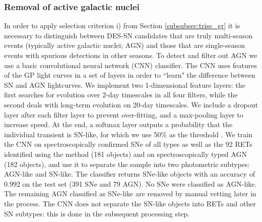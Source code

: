 \documentclass[fleqn,usenatbib,]{mnras}
\newcommand{\replyref}[1]{\color{magenta}#1 \color{black}}
\begin{document}
\subsubsection{Removal of active galactic nuclei \label{subsubsec:cnn}}

In order to apply selection criterion i) from Section \ref{subsubsec:trise_gr} it is necessary to distinguish between DES-SN candidates that are truly multi-season events (typically active galactic nuclei; AGN) and those that are single-season events with spurious detections in other seasons. 
To detect and filter out AGN we use a basic convolutional neural network (CNN) classifier. \replyref{The CNN uses features of the GP light curves in a set of layers in order to ``learn" the difference between SN and AGN lightcurves. We implement two 1-dimensional feature layers: the first searches for evolution over 2-day timescales in all four filters, while the second deals with long-term evolution on 20-day timescales. We include a dropout layer after each filter layer to prevent over-fitting, and a max-pooling layer to increase speed. At the end, a softmax layer outputs a probability that the individual transient is SN-like, for which we use 50\% as the threshold}.  We train the CNN on spectroscopically confirmed SNe of all types as well as the 92 RETs identified using the  method (181 objects) and on spectroscopically typed AGN (182 objects), and use it to separate the sample into two photometric subtypes: AGN-like and SN-like. The classifier returns SNe-like objects with an accuracy of 0.992 on the test set (391 SNe and 79 AGN). No SNe were classified as AGN-like. The remaining AGN classified as SNe-like are removed by manual vetting later in the process. The CNN does not separate the SN-like objects into RETs and other SN subtypes: this is done in the subsequent processing step.
\end{document}
